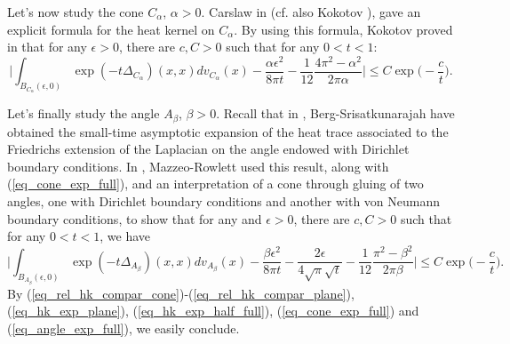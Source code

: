 \documentclass[12pt]{article}
\numberwithin{equation}{section}
\theoremstyle{theorem}
\theoremstyle{definition}
\theoremstyle{remark}
\newcommand{\laplcomp}{\Delta}
\begin{document}
	\par 
	Let's now study the cone $C_{\alpha}$, $\alpha > 0$.
	Carslaw in \cite{CarslawGreenSom} (cf. also Kokotov \cite[\S 3.1]{KokotCompPolyh}), gave an explicit formula for the heat kernel on $C_{\alpha}$. 
	By using this formula, Kokotov proved in \cite[Proposition 1, Remark 1]{KokotCompPolyh} that for any $\epsilon > 0$, there are $c, C > 0$ such that for any $0 < t < 1$:
	\begin{equation}\label{eq_cone_exp_full}
		\Big|
			\int_{B_{C_{\alpha}}(\epsilon, 0)} \exp(- t \laplcomp_{C_{\alpha}})(x, x) dv_{C_{\alpha}}(x)
			-
			\frac{\alpha \epsilon^2}{8 \pi t}
			-
			\frac{1}{12} \frac{4 \pi^2 - \alpha^2}{2 \pi \alpha}
		\Big|
		\leq
		C
		\exp\Big(-\frac{c}{t} \Big).
	\end{equation}
	\par 
	Let's finally study the angle $A_{\beta}$, $\beta > 0$.
	Recall that in \cite[Theorem 1]{BergSri}, Berg-Srisatkunarajah have obtained the small-time asymptotic expansion of the heat trace associated to the Friedrichs extension of the Laplacian on the angle endowed with Dirichlet boundary conditions.
	In \cite[Proposition 2.1 and (4.2)]{MazzRow}, Mazzeo-Rowlett used this result, along with (\ref{eq_cone_exp_full}), and an interpretation of a cone through gluing of two angles, one with Dirichlet boundary conditions and another with von Neumann boundary conditions, to show that for any and $\epsilon > 0$, there are $c, C > 0$ such that for any $0 < t < 1$, we have
	\begin{equation}\label{eq_angle_exp_full}
		\Big|
			\int_{B_{A_{\beta}}(\epsilon, 0)} \exp(- t \laplcomp_{A_{\beta}})(x, x) dv_{A_{\beta}}(x)
			-
			\frac{\beta \epsilon^2}{8 \pi t}
			-
			\frac{2 \epsilon}{4 \sqrt{\pi} \sqrt{t}}
			-
			\frac{1}{12} \frac{\pi^2 - \beta^2}{2 \pi \beta}
		\Big|
		\leq
		C
		\exp\Big(-\frac{c}{t} \Big).
	\end{equation}
	By (\ref{eq_rel_hk_compar_cone})-(\ref{eq_rel_hk_compar_plane}), (\ref{eq_hk_exp_plane}), (\ref{eq_hk_exp_half_full}), (\ref{eq_cone_exp_full}) and (\ref{eq_angle_exp_full}), we easily conclude.	
	
\end{document}
